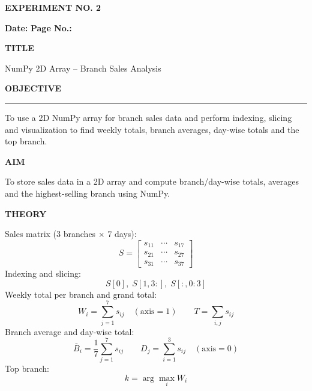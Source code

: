 \documentclass[11pt,twoside]{article}
\newcommand{\expheading}[1]{{\fontsize{14}{17}\selectfont\textbf{#1}\par}}
\newcommand{\fullrule}{\noindent\rule{\textwidth}{0.6pt}\par}
\newcommand{\tooddpage}{\clearpage\ifodd\value{page}\else\null\thispagestyle{empty}\newpage\fi}
\begin{document}
\tooddpage

{\setlength{\parskip}{1pt}\setlength{\abovedisplayskip}{2pt}\setlength{\belowdisplayskip}{2pt}
\begin{center}
\expheading{EXPERIMENT NO. 2}
\end{center}
\vspace{2pt}

\noindent\textbf{Date:} \underline{\hspace{2.6cm}} \hfill \textbf{Page No.:} \underline{\hspace{2.6cm}}\par
\vspace{6pt}

\expheading{TITLE}
\vspace{4pt}
\noindent NumPy 2D Array -- Branch Sales Analysis\par
\vspace{4pt}

\expheading{OBJECTIVE}
\vspace{2pt}
\fullrule
\vspace{4pt}
\noindent To use a 2D NumPy array for branch sales data and perform indexing, slicing and visualization to find weekly totals, branch averages, day-wise totals and the top branch. \par
\vspace{4pt}

\expheading{AIM}
\vspace{4pt}
\noindent To store sales data in a 2D array and compute branch/day-wise totals, averages and the highest-selling branch using NumPy. \par
\vspace{4pt}

\expheading{THEORY}
\vspace{4pt}
Sales matrix ($3$ branches $\times$ $7$ days):
\[S=\begin{bmatrix}s_{11} & \cdots & s_{17}\\s_{21} & \cdots & s_{27}\\s_{31} & \cdots & s_{37}\end{bmatrix}\]
Indexing and slicing:
\[S[0],\; S[1,3:],\; S[:,0:3]\]
Weekly total per branch and grand total:
\[W_i=\sum_{j=1}^{7}s_{ij}\quad(\text{axis}=1)\qquad T=\sum_{i,j}s_{ij}\]
Branch average and day-wise total:
\[\bar{B}_i=\frac{1}{7}\sum_{j=1}^{7}s_{ij}\qquad D_j=\sum_{i=1}^{3}s_{ij}\quad(\text{axis}=0)\]
Top branch:
\[k=\arg\max_i W_i\]
\vspace{4pt}

}
\end{document}
